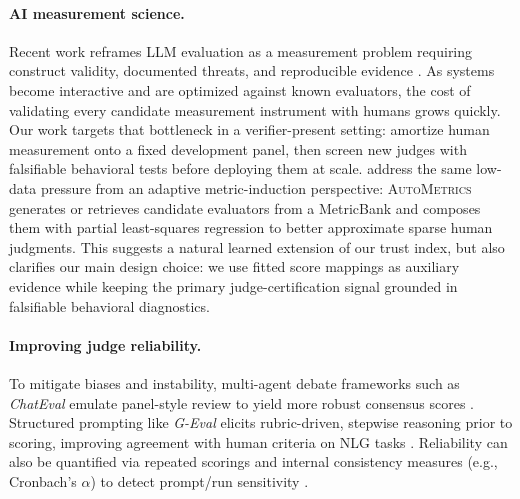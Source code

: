 \documentclass{article}
\begin{document}
\paragraph{AI measurement science.}
Recent work reframes LLM evaluation as a measurement problem requiring construct validity, documented threats, and reproducible evidence \citep{salaudeen2025measurement}.
As systems become interactive and are optimized against known evaluators, the cost of validating every candidate measurement instrument with humans grows quickly.
Our work targets that bottleneck in a verifier-present setting: amortize human measurement onto a fixed development panel, then screen new judges with falsifiable behavioral tests before deploying them at scale.
\citet{ryan2025autometrics} address the same low-data pressure from an adaptive metric-induction perspective: \textsc{AutoMetrics} generates or retrieves candidate evaluators from a MetricBank and composes them with partial least-squares regression to better approximate sparse human judgments.
This suggests a natural learned extension of our trust index, but also clarifies our main design choice: we use fitted score mappings as auxiliary evidence while keeping the primary judge-certification signal grounded in falsifiable behavioral diagnostics.

\paragraph{Improving judge reliability.}
To mitigate biases and instability, multi-agent debate frameworks such as \emph{ChatEval} emulate panel-style review to yield more robust consensus scores \citep{Chan2024ChatEval}. Structured prompting like \emph{G-Eval} elicits rubric-driven, stepwise reasoning prior to scoring, improving agreement with human criteria on NLG tasks \citep{Liu2023GEval}. Reliability can also be quantified via repeated scorings and internal consistency measures (e.g., Cronbach’s $\alpha$) to detect prompt/run sensitivity \citep{Li2024TrustLLMJudgments}.
\end{document}
